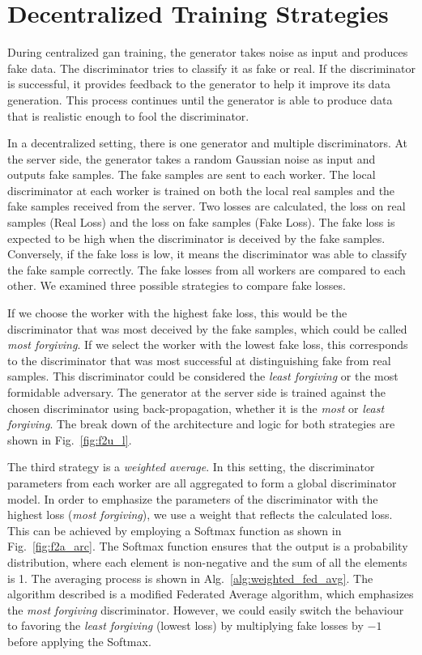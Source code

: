 \section{Decentralized Training Strategies}

During centralized \gls*{gan} training, the generator takes noise as input and produces fake data. The discriminator tries to classify it as fake or real. If the discriminator is successful, it provides feedback to the generator to help it improve its data generation. This process continues until the generator is able to produce data that is realistic enough to fool the discriminator.

In a decentralized setting, there is one generator and multiple discriminators. 
At the server side, the generator takes a random Gaussian noise as input and outputs fake samples. The fake samples are sent to each worker. The local discriminator at each worker is trained on both the local real samples and the fake samples received from the server. Two losses are calculated, the loss on real samples (Real Loss) and the loss on fake samples (Fake Loss). 
%
The fake loss is expected to be high when the discriminator is deceived by the fake samples. Conversely, if the fake loss is low, it means the discriminator was able to classify the fake sample correctly. The fake losses from all workers are compared to each other. We examined three possible strategies to compare fake losses. 

If we choose the worker with the highest fake loss, this would be the discriminator that was most deceived by the fake samples, which could be called \emph{most forgiving}. If we select the worker with the lowest fake loss, this corresponds to the discriminator that was most successful at distinguishing fake from real samples. This discriminator could be considered the \emph{least forgiving} or the most formidable adversary. The generator at the server side is trained against the chosen discriminator using back-propagation, whether it is the \emph{most} or \emph{least forgiving}. The break down of the architecture and logic for both strategies are shown in Fig.~\ref{fig:f2u_l}.
%
\def\ftouscale{0.6}


The third strategy is a \emph{weighted average}. In this setting, the discriminator parameters from each worker are all aggregated to form a global discriminator model. In order to emphasize the parameters of the discriminator with the highest loss (\emph{most forgiving}), we use a weight that reflects the calculated loss. This can be achieved by employing a Softmax function as shown in Fig.~\ref{fig:f2a_arc}. The Softmax function ensures that the output is a probability distribution, where each element is non-negative and the sum of all the elements is 1. The averaging process is shown in Alg.~\ref{alg:weighted_fed_avg}. The algorithm described is a modified Federated Average algorithm, which emphasizes the \emph{most forgiving} discriminator. However, we could easily switch the behaviour to favoring the \emph{least forgiving} (lowest loss) by multiplying fake losses by $-1$ before applying the Softmax.

